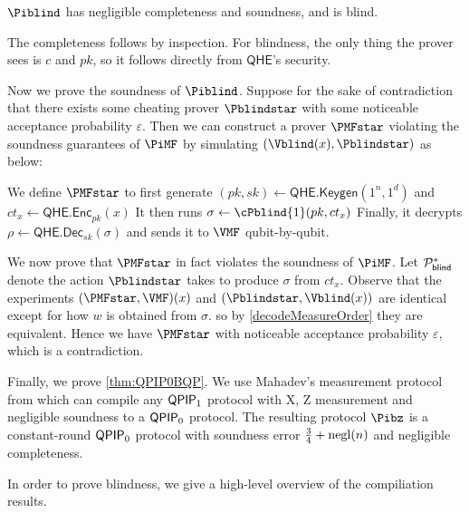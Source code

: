 \begin{thm}
	\label{thm:BlindBQP}
	$\Piblind$ has negligible completeness and soundness, and is blind.
\end{thm}
\begin{prf}
	The completeness follows by inspection.
	For blindness, the only thing the prover sees is $c$ and $pk$, so it follows directly from $\mathsf{QHE}$'s security.
	
	Now we prove the soundness of $\Piblind$.
	Suppose for the sake of contradiction that there exists some cheating prover $\Pblindstar$ with some noticeable acceptance probability $\varepsilon$.
	Then we can construct a prover $\PMFstar$ violating the soundness guarantees of $\PiMF$ by simulating $(\Vblind(x), \Pblindstar)$ as below:

	We define $\PMFstar$ to first generate
	$(pk, sk)\leftarrow\mathsf{QHE.Keygen}(1^n, 1^d)$
	and
	$ct_x\leftarrow\mathsf{QHE.Enc}_{pk}(x)$
	It then runs $\sigma\leftarrow\cPblind{1}(pk, ct_x)$
	Finally, it decrypts
	$\rho\leftarrow\mathsf{QHE.Dec}_{sk}(\sigma)$
	and sends it to $\VMF$ qubit-by-qubit.

	We now prove that $\PMFstar$ in fact violates the soundness of $\PiMF$.
	Let $\mathcal{P}_{\mathsf{blind}}^*$ denote the action $\Pblindstar$ takes to produce $\sigma$ from $ct_x$.
	Observe that the experiments $(\PMFstar, \VMF)(x)$ and $(\Pblindstar, \Vblind(x))$ are identical except for how $w$ is obtained from $\sigma$.
	so by \cref{decodeMeasureOrder} they are equivalent.
	Hence we have $\PMFstar$ with noticeable acceptance probability $\varepsilon$, which is a contradiction.
\end{prf}



Finally, we prove \cref{thm:QPIP0BQP}.
We use Mahadev's measurement protocol from \cite{FOCS:Mahadev18a} which can compile any $\operatorname{\mathsf{QPIP}}_1$ protocol with X, Z measurement and negligible soundness to a $\operatorname{\mathsf{QPIP}}_0$ protocol.
The resulting protocol $\Pibz$ is a constant-round $\operatorname{\mathsf{QPIP}}_0$ protocol with soundness error $\frac{3}{4} + \operatorname{negl}(n)$ and negligible completeness.

In order to prove blindness, we give a high-level overview of the compiliation results.

